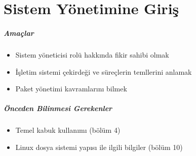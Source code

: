 \chapter{Sistem Yönetimine Giriş}
\paragraph{Amaçlar}{
\begin{itemize}
\item Sistem yöneticisi rolü hakkında fikir sahibi olmak
\item İşletim sistemi çekirdeği ve süreçlerin temllerini anlamak
\item Paket yönetimi kavramlarını bilmek
\end{itemize}
}
\paragraph{Önceden Bilinmesi Gerekenler}{
\begin{itemize}
 \item Temel kabuk kullanımı (bölüm 4)
 \item Linux dosya sistemi yapısı ile ilgili bilgiler (bölüm 10)
 \end{itemize}
} 
 
